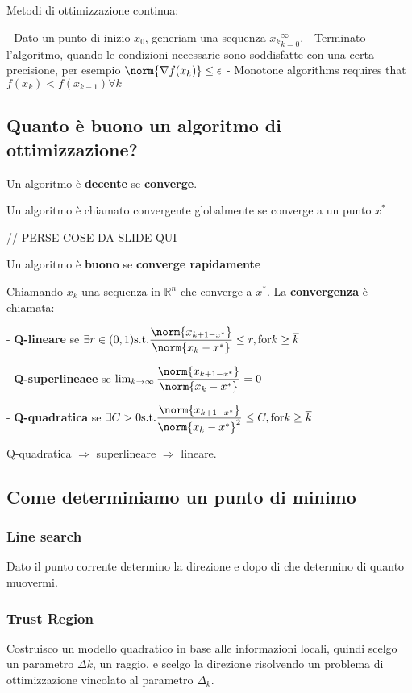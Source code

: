 \documentclass[\main/main.tex]{subfiles}
\begin{document}
Metodi di ottimizzazione continua:

- Dato un punto di inizio $x_0$, generiam una sequenza ${x_k}^\infty_{k=0}$.
- Terminato l'algoritmo, quando le condizioni necessarie sono soddisfatte con una certa precisione, per esempio $\norm{\nabla f(x_k)}\leq \epsilon$
- Monotone algorithms requires that $f(x_k) < f(x_{k-1}) \forall k$

\subsection{Quanto è buono un algoritmo di ottimizzazione?}

Un algoritmo è \textbf{decente} se \textbf{converge}.

\begin{definition}
	Un algoritmo è chiamato convergente globalmente se converge a un punto $x^*$
\end{definition}

// PERSE COSE DA SLIDE QUI

Un algoritmo è \textbf{buono} se \textbf{converge rapidamente}

Chiamando $x_k$ una sequenza in $\mathbb{R}^n$ che converge a $x^*$. La \textbf{convergenza} è chiamata:

- \textbf{Q-lineare} se $\exists r \in (0,1) \text{s.t.} \dfrac{\norm{x_{k+1-x^*}}}{\norm{x_k - x^*}} \leq r, \text{for} k \geq \overline{k}$

- \textbf{Q-superlineaee} se $\lim_{k\rightarrow \infty} \dfrac{\norm{x_{k+1-x^*}}}{\norm{x_k - x^*}} = 0$

- \textbf{Q-quadratica} se $\exists C > 0 \text{s.t.} \dfrac{\norm{x_{k+1-x^*}}}{\norm{x_k - x^*}^2} \leq C, \text{for} k \geq \overline{k}$

Q-quadratica $\Rightarrow$ superlineare  $\Rightarrow$ lineare.


\subsection{Come determiniamo un punto di minimo}

\subsubsection{Line search}
Dato il punto corrente determino la direzione e dopo di che determino di quanto muovermi.

\subsubsection{Trust Region}
Costruisco un modello quadratico in base alle informazioni locali, quindi scelgo un parametro $\Delta k$, un raggio, e scelgo la direzione risolvendo un problema di ottimizzazione vincolato al parametro $\Delta_k$.
\end{document}
